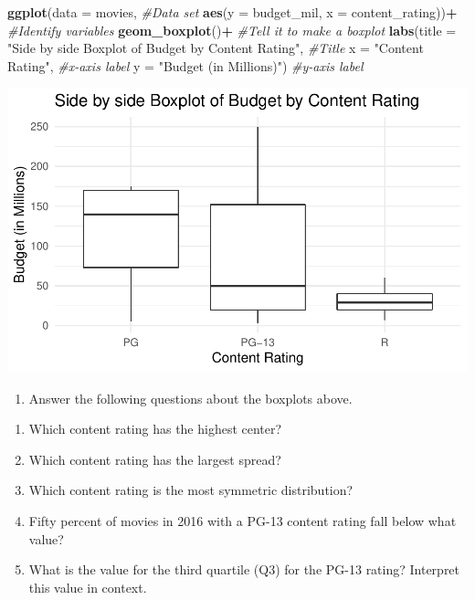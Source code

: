 \documentclass[
]{report}
\newenvironment{Shaded}{\begin{snugshade}}{\end{snugshade}}
\newcommand{\CommentTok}[1]{\textcolor[rgb]{0.56,0.35,0.01}{\textit{#1}}}
\newcommand{\DataTypeTok}[1]{\textcolor[rgb]{0.13,0.29,0.53}{#1}}
\newcommand{\KeywordTok}[1]{\textcolor[rgb]{0.13,0.29,0.53}{\textbf{#1}}}
\newcommand{\NormalTok}[1]{#1}
\newcommand{\OperatorTok}[1]{\textcolor[rgb]{0.81,0.36,0.00}{\textbf{#1}}}
\newcommand{\StringTok}[1]{\textcolor[rgb]{0.31,0.60,0.02}{#1}}
\providecommand{\tightlist}{%
  \setlength{\itemsep}{0pt}\setlength{\parskip}{0pt}}
\begin{document}
\begin{Shaded}
\begin{Highlighting}[]
\KeywordTok{ggplot}\NormalTok{(}\DataTypeTok{data =}\NormalTok{ movies,  }\CommentTok{\#Data set}
       \KeywordTok{aes}\NormalTok{(}\DataTypeTok{y =}\NormalTok{ budget\_mil, }\DataTypeTok{x =}\NormalTok{ content\_rating))}\OperatorTok{+}\StringTok{  }\CommentTok{\#Identify variables}
\StringTok{  }\KeywordTok{geom\_boxplot}\NormalTok{()}\OperatorTok{+}\StringTok{  }\CommentTok{\#Tell it to make a boxplot}
\StringTok{  }\KeywordTok{labs}\NormalTok{(}\DataTypeTok{title =} \StringTok{"Side by side Boxplot of Budget by Content Rating"}\NormalTok{,  }\CommentTok{\#Title}
        \DataTypeTok{x =} \StringTok{"Content Rating"}\NormalTok{,    }\CommentTok{\#x{-}axis label}
       \DataTypeTok{y =} \StringTok{"Budget (in Millions)"}\NormalTok{)  }\CommentTok{\#y{-}axis label}
\end{Highlighting}
\end{Shaded}

\begin{center}\includegraphics[width=0.6\linewidth]{04-EDA-quantitative_files/figure-latex/unnamed-chunk-4-1} \end{center}

\begin{enumerate}
\def\labelenumi{\arabic{enumi}.}
\setcounter{enumi}{10}
\tightlist
\item
  Answer the following questions about the boxplots above.
\end{enumerate}

\begin{enumerate}
\def\labelenumi{\alph{enumi}.}
\item
  Which content rating has the highest center?
  \vspace{0.2in}
\item
  Which content rating has the largest spread?
  \vspace{0.2in}
\item
  Which content rating is the most symmetric distribution?
  \vspace{0.2in}
\item
  Fifty percent of movies in 2016 with a PG-13 content rating fall below what value?
  \vspace{0.2in}
\item
  What is the value for the third quartile (Q3) for the PG-13 rating? Interpret this value in context.
  \vspace{.5in}
\end{enumerate}
\end{document}

